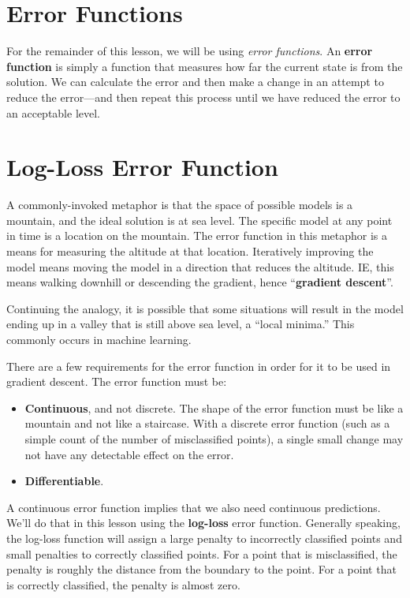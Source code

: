 \section{Error Functions}
For the remainder of this lesson, we will be using \textit{error functions}. An \textbf{error function} is simply a function that measures how far the current state is from the solution. We can calculate the error and then make a change in an attempt to reduce the error—and then repeat this process until we have reduced the error to an acceptable level.


\section{Log-Loss Error Function}
A commonly-invoked metaphor is that the space of possible models is a mountain, and the ideal solution is at sea level. The specific model at any point in time is a location on the mountain. The error function in this metaphor is a means for measuring the altitude at that location. Iteratively improving the model means moving the model in a direction that reduces the altitude. IE, this means walking downhill or descending the gradient, hence “\textbf{gradient descent}”. \newline

Continuing the analogy, it is possible that some situations will result in the model ending up in a valley that is still above sea level, a “local minima.” This commonly occurs in machine learning. \newline

There are a few requirements for the error function in order for it to be used in gradient descent. The error function must be:

\begin{itemize}
    \item \textbf{Continuous}, and not discrete. The shape of the error function must be like a mountain and not like a staircase. With a discrete error function (such as a simple count of the number of misclassified points), a single small change may not have any detectable effect on the error.
    \item \textbf{Differentiable}.
\end{itemize}
A continuous error function implies that we also need continuous predictions. We'll do that in this lesson using the \textbf{log-loss} error function. Generally speaking, the log-loss function will assign a large penalty to incorrectly classified points and small penalties to correctly classified points. For a point that is misclassified, the penalty is roughly the distance from the boundary to the point. For a point that is correctly classified, the penalty is almost zero.\newline

